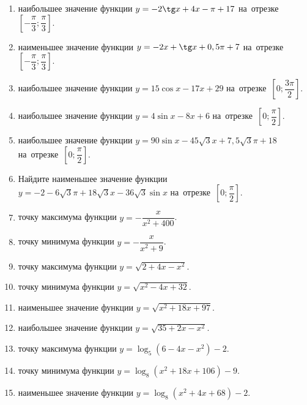\documentclass[a4paper,10pt]{article}
\begin{document}
\begin{enumerate}
\item {} наибольшее значение функции $y=-2\tg x +4x-\pi +17$ на~отрезке~$\left[-\dfrac{\pi}{3};\dfrac{\pi}{3}\right]$.

\item {} наименьшее значение функции $y=-2x +\tg x+0,5\pi+7$ на~отрезке~$\left[-\dfrac{\pi}{3};\dfrac{\pi}{3}\right]$.

\item {} наибольшее значение функции $y=15\cos x-17x+29$ на~отрезке~$\left[0;\dfrac{3\pi}{2}\right]$.

\item {} наибольшее значение функции $y=4\sin x-8x+6$ на~отрезке~$\left[0;\dfrac{\pi}{2}\right]$.

\item {} наибольшее значение функции $y=90\sin x-45\sqrt{3}x+7,5\sqrt{3}\pi +18$ на~отрезке~$\left[0;\dfrac{\pi}{2}\right]$.

\item Найдите наименьшее значение функции $y=-2-6\sqrt{3}\pi+18\sqrt{3}x-36\sqrt{3}\sin x$ на~отрезке~$\left[0;\dfrac{\pi}{2}\right]$.

\item {} точку максимума функции $y=-\dfrac{x}{ x^2 +400}$.

\item {} точку минимума функции $y=-\dfrac{x}{ x^2 +9}$.

\item {} точку максимума функции $y=\sqrt{2+4x-x^2}$.

\item {} точку минимума функции $y=\sqrt{x^2-4x+32}$.

\item {} наименьшее значение функции $y=\sqrt{x^2+18x+97}$.

\item {} наибольшее значение функции $y=\sqrt{35+2x-x^2}$.

\item {} точку максимума функции $y=\log_5\left(6-4x-x^2\right)-2$.

\item {} точку минимума функции $y=\log_8\left(x^2+18x+106\right)-9$.

\item {} наименьшее значение функции $y=\log_8\left(x^2+4x+68\right)-2$.


\end{enumerate}
\end{document}
